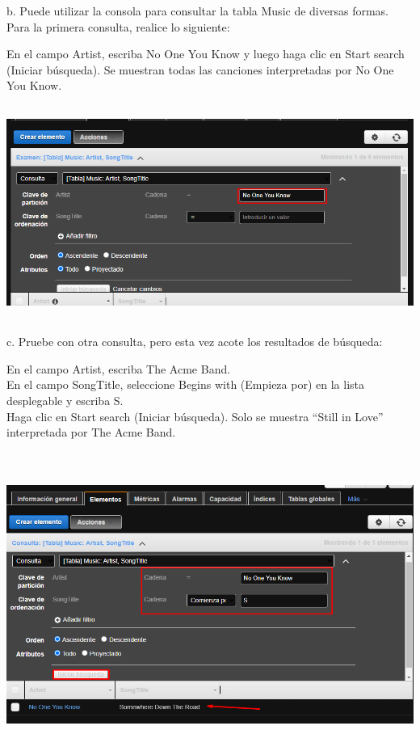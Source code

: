 \documentclass[12pt,letterpaper]{article}
\begin{document}
\newpage
b. Puede utilizar la consola para consultar la tabla Music de diversas formas. Para la primera consulta, realice lo siguiente:

En el campo Artist, escriba No One You Know y luego haga clic en Start search (Iniciar búsqueda). Se muestran todas las canciones interpretadas por No One You Know.


\begin{center}
    \includegraphics[width=18cm, height=7cm]{img/3b.png}  
\end{center}

c. Pruebe con otra consulta, pero esta vez acote los resultados de búsqueda:

En el campo Artist, escriba The Acme Band.
\\En el campo SongTitle, seleccione Begins with (Empieza por) en la lista desplegable y escriba S.
\\Haga clic en Start search (Iniciar búsqueda).  Solo se muestra “Still in Love” interpretada por The Acme Band.
\begin{center}
    \includegraphics[width=18cm, height=10cm]{img/3C.png}  
\end{center}
\end{document}
